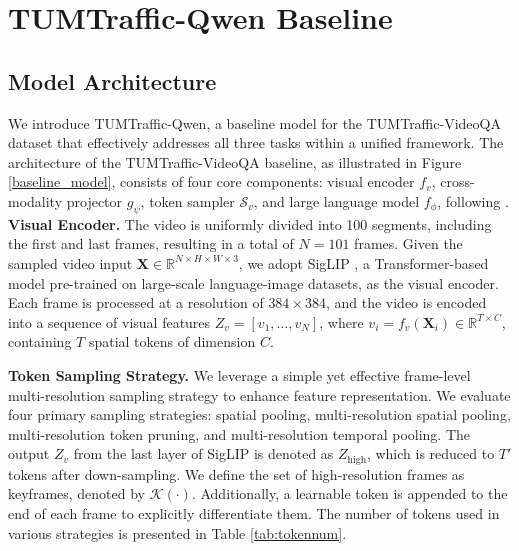 \section{TUMTraffic-Qwen Baseline}


\subsection{Model Architecture}

We introduce TUMTraffic-Qwen, a baseline model for the TUMTraffic-VideoQA dataset that effectively addresses all three tasks within a unified framework. The architecture of the TUMTraffic-VideoQA baseline, as illustrated in Figure \ref{baseline_model}, consists of four core components: visual encoder $f_v$, cross-modality projector $ g_\psi $, token sampler $\mathcal{S}_v$, and large language model $f_\phi$, following \cite{li2024llavaonevisioneasyvisualtask}. \\




\noindent\textbf{Visual Encoder.} The video is uniformly divided into 100 segments, including the first and last frames, resulting in a total of \( N = 101 \) frames. Given the sampled video input \( \mathbf{X} \in \mathbb{R}^{N \times H \times W \times 3} \), we adopt SigLIP \cite{siglip}, a Transformer-based model pre-trained on large-scale language-image datasets, as the visual encoder. Each frame is processed at a resolution of \( 384 \times 384 \), and the video is encoded into a sequence of visual features \( Z_v = [v_1, \dots, v_N] \), where \( v_i = f_v (\mathbf{X}_i) \in \mathbb{R}^{T \times C} \), containing $T$ spatial tokens of dimension $C$.

 
 
\noindent\textbf{Token Sampling Strategy.} We leverage a simple yet effective frame-level multi-resolution sampling strategy to enhance feature representation. We evaluate four primary sampling strategies: spatial pooling, multi-resolution spatial pooling, multi-resolution token pruning, and multi-resolution temporal pooling. The output $Z_{v}$ from the last layer of SigLIP is denoted as $Z_{\text{high}}$, which is reduced to $T'$ tokens after down-sampling. We define the set of high-resolution frames as keyframes, denoted by $\mathcal{K}(\cdot)$. Additionally, a learnable token is appended to the end of each frame to explicitly differentiate them. The number of tokens used in various strategies is presented in Table \ref{tab:tokennum}.

